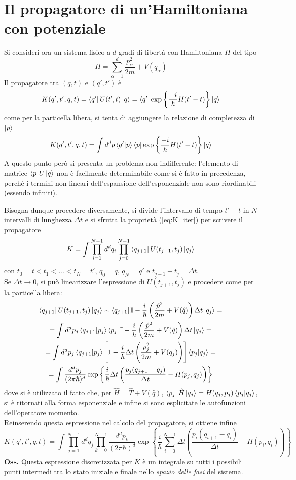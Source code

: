 \section{Il propagatore di un'Hamiltoniana con potenziale}
Si consideri ora un sistema fisico a $d$ gradi di libertà con Hamiltoniana $H$ del tipo
$$H = \sum_{\alpha=1}^{d}\frac{p^2_\alpha}{2m} + V(q_\alpha)$$
Il propagatore tra $(q,t)$ e $(q',t')$ è
$$K(q',t',q,t) = \bra{q'}U(t',t)\ket{q} = \bra{q'}\exp\left\{\frac{-i}{\hbar}H(t'-t)\right\}\ket{q}$$
come per la particella libera, si tenta di aggiungere la relazione di completezza di $\ket{p}$
$$K(q',t',q,t) = \int d^dp\bra{q'}\ket{p}\bra{p}\exp\left\{\frac{-i}{\hbar}H(t'-t)\right\}\ket{q}$$
A questo punto però si presenta un problema non indifferente:
l'elemento di matrice $\bra{p}U\ket{q}$ non è facilmente determinabile come si è fatto in precedenza,
perché i termini non lineari dell'espansione dell'esponenziale non sono riordinabili
(essendo infiniti).

Bisogna dunque procedere diversamente, si divide l'intervallo di tempo $t'-t$ in $N$ intervalli di
lunghezza $\Delta t$ e si sfrutta la proprietà (\ref{eq:K_iter}) per scrivere il propagatore
$$K=\int \prod_{i=1}^{N-1} d^dq_i \prod_{j=0}^{N-1}\bra{q_{j+1}}U(t_{j+1},t_j)\ket{q_j}$$
con $t_0=t<t_1<...<t_N=t'$, $q_0=q$, $q_N=q'$ e $t_{j+1}-t_{j}=\Delta t$.\\
Se $\Delta t \to0$, si può linearizzare l'espressione di $U(t_{j+1},t_j)$ e procedere come
per la particella libera:
\begin{gather*}
\bra{q_{j+1}}U(t_{j+1},t_j)\ket{q_j}\sim \bra{q_{j+1}}\mathbb{I}-\frac{i}{\hbar}\left(\frac{\hat p^2}{2m}
+V(\hat q)\right)\Delta t\ket{q_j}=\\
=\int d^dp_j \bra{q_{j+1}}\ket{p_j}\bra{p_j}\mathbb{I}-\frac{i}{\hbar}\left(\frac{\hat p^2}{2m}+
V(\hat q)\right)\Delta t\ket{q_j}=\\
=\int d^dp_j \bra{q_{j+1}}\ket{p_j}\left[1-\frac{i}{\hbar}\Delta t\left(\frac{p_j^2}{2m}+V(q_j)
\right)\right]\bra{p_j}\ket{q_j}=\\
=\int \frac{d^dp_j}{(2\pi\hbar)^d}\exp\left\{\frac{i}{\hbar}\Delta t\left(\frac{p_j(q_{j+1}-q_j)}
{\Delta t} - H(p_j,q_j)\right)\right\}
\end{gather*}
dove si è utilizzato il fatto che, per $\hat H=\hat T+V(\hat q)$, $\bra{p_j}\hat H\ket{q_j}=H(q_j,p_j)\bra{p_j}\ket{q_j}$, si è ritornati
alla forma esponenziale e infine si sono esplicitate le autofunzioni dell'operatore momento.\\
Reinserendo questa espressione nel calcolo del propagatore, si ottiene infine
\begin{equation}
\boxed{K(q',t',q,t) = \int\prod_{j=1}^{N-1}d^dq_j\prod_{k=0}^{N-1}\frac{d^dp_k}{(2\pi\hbar)^d}
\exp\left\{\frac{i}{\hbar}\sum_{i=0}^{N-1}\Delta t \left(\frac{p_i(q_{i+1}-q_i)}{\Delta t}-H(p_i,q_i)
\right)\right\}}
\label{eq:K_discr_tot}
\end{equation}
\textbf{Oss.} Questa espressione discretizzata per $K$ è un integrale su tutti i possibili punti
intermedi tra lo stato iniziale e finale nello \textit{spazio delle fasi} del sistema.

